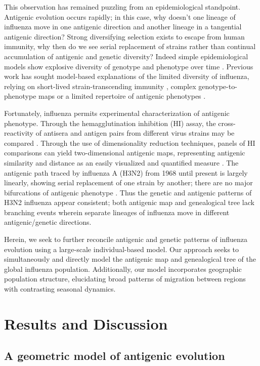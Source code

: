 \documentclass[11pt,oneside,letterpaper]{article}
\begin{document}
This observation has remained puzzling from an epidemiological standpoint.  Antigenic evolution occurs rapidly; in this case, why doesn't one lineage of influenza move in one antigenic direction and another lineage in a tangential antigenic direction?  Strong diversifying selection exists to escape from human immunity, why then do we see serial replacement of strains rather than continual accumulation of antigenic and genetic diversity?  Indeed simple epidemiological models show explosive diversity of genotype and phenotype over time \cite{Ferguson03,Tria05}.  Previous work has sought model-based explanations of the limited diversity of influenza, relying on short-lived strain-transcending immunity \cite{Ferguson03,Tria05}, complex genotype-to-phenotype maps \cite{Koelle06} or a limited repertoire of antigenic phenotypes \cite{Recker07}. 

Fortunately, influenza permits experimental characterization of antigenic phenotype.  Through the hemagglutination inhibition (HI) assay, the cross-reactivity of antisera and antigen pairs from different virus strains may be compared \cite{Hirst43}.  Through the use of dimensionality reduction techniques, panels of HI comparisons can yield two-dimensional antigenic maps, representing antigenic similarity and distance as an easily visualized and quantified measure \cite{Smith04}.  The antigenic path traced by influenza A (H3N2) from 1968 until present is largely linearly, showing serial replacement of one strain by another; there are no major bifurcations of antigenic phenotype \cite{Smith04}.  Thus the genetic and antigenic patterns of H3N2 influenza appear consistent; both antigenic map and genealogical tree lack branching events wherein separate lineages of influenza move in different antigenic/genetic directions.

Herein, we seek to further reconcile antigenic and genetic patterns of influenza evolution using a large-scale individual-based model.  Our approach seeks to simultaneously and directly model the antigenic map and genealogical tree of the global influenza population.  Additionally, our model incorporates geographic population structure, elucidating broad patterns of migration between regions with contrasting seasonal dynamics.

\section*{Results and Discussion}

\subsection*{A geometric model of antigenic evolution}
\end{document}

